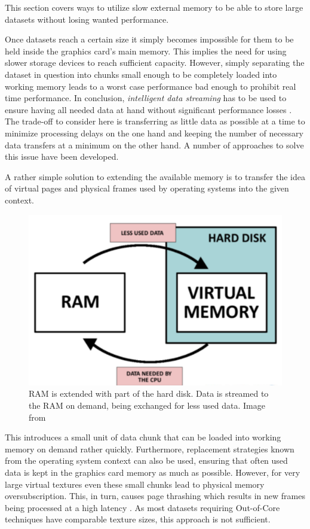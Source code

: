 This section covers ways to utilize slow external memory to be able to store large datasets without losing wanted performance.

Once datasets reach a certain size it simply becomes impossible for them to be held inside the graphics card's main memory. This implies the need for using slower storage devices to reach sufficient capacity. However, simply separating the dataset in question into chunks small enough to be completely loaded into working memory leads to a worst case performance bad enough to prohibit real time performance. In conclusion, \textit{intelligent data streaming} has to be used to ensure having all needed data at hand without significant performance losses \cite{Crassin:2009:GRS:1507149.1507152}. The trade-off to consider here is transferring as little data as possible at a time to minimize processing delays on the one hand and keeping the number of necessary data transfers at a minimum on the other hand. A number of approaches to solve this issue have been developed.

A rather simple solution to extending the available memory is to transfer the idea of virtual pages and physical frames used by operating systems into the given context. 

\begin{figure}[h]
  \begin{center}
    \includegraphics[width=.3\textwidth]{logos/virtual_memory_concept.png}
    \caption{RAM is extended with part of the hard disk. Data is streamed to the RAM on demand, being exchanged for less used data. Image from \cite{TechICT:VirtualMemory}}
  \end{center}
\end{figure}

This introduces a small unit of data chunk that can be loaded into working memory on demand rather quickly. Furthermore, replacement strategies known from the operating system context can also be used, ensuring that often used data is kept in the graphics card memory as much as possible. However, for very large virtual textures even these small chunks lead to physical memory oversubscription. This, in turn, causes page thrashing which results in new frames being processed at a high latency \cite{van2009id}. As most datasets requiring Out-of-Core techniques have comparable texture sizes, this approach is not sufficient.

